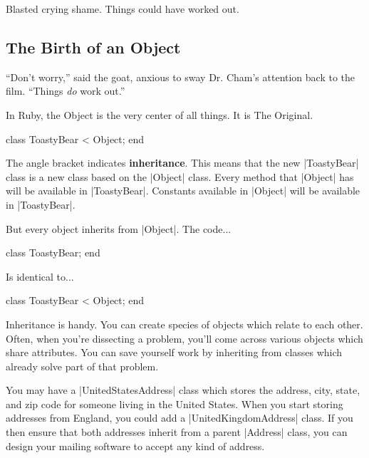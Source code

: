 \documentclass[12pt,twoside]{report}
\begin{document}
Blasted crying shame.  Things could have worked out.



\subsection{The Birth of an Object}



``Don't worry,'' said the goat, anxious to sway Dr. Cham's attention
back to the film.  ``Things {\em do} work out.''

In Ruby, the Object is the very center of all things.  It is The
Original.


\begin{rubycode}

 class ToastyBear < Object; end

\end{rubycode}


The angle bracket indicates {\bf inheritance}.  This means that the
new \rubyinline|ToastyBear| class is a new class based
on the \rubyinline|Object| class.  Every method that
\rubyinline|Object| has will be available in
\rubyinline|ToastyBear|.  Constants available in
\rubyinline|Object| will be available in
\rubyinline|ToastyBear|.

But every object inherits from \rubyinline|Object|.
The code...


\begin{rubycode}

 class ToastyBear; end

\end{rubycode}


Is identical to...


\begin{rubycode}

 class ToastyBear < Object; end

\end{rubycode}


Inheritance is handy.  You can create species of objects which relate
to each other. Often, when you're dissecting a problem, you'll come
across various objects which share attributes.  You can save yourself
work by inheriting from classes which already solve part of that
problem.

You may have a \rubyinline|UnitedStatesAddress| class
which stores the address, city, state, and zip code for someone living
in the United States.  When you start storing addresses from England,
you could add a \rubyinline|UnitedKingdomAddress|
class.  If you then ensure that both addresses inherit from a parent
\rubyinline|Address| class, you can design your
mailing software to accept any kind of address.
\end{document}
